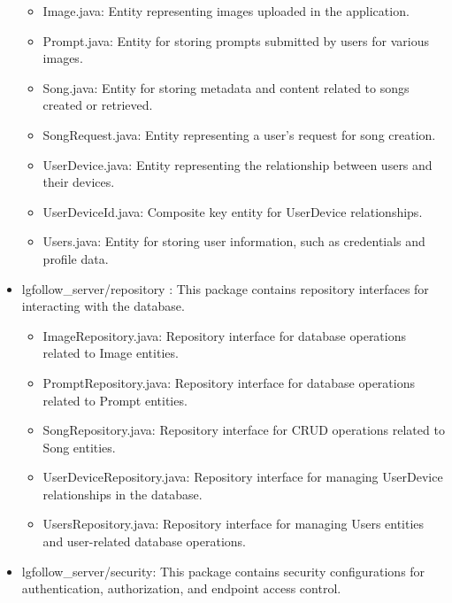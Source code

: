 \documentclass[conference]{IEEEtran}
\begin{document}
\begin{itemize}
\begin{itemize}
        \item Image.java: Entity representing images uploaded in the application. \\
        \item Prompt.java: Entity for storing prompts submitted by users for various images. \\
        \item Song.java: Entity for storing metadata and content related to songs created or retrieved. \\
        \item SongRequest.java: Entity representing a user's request for song creation. \\
        \item UserDevice.java: Entity representing the relationship between users and their devices. \\
        \item UserDeviceId.java: Composite key entity for UserDevice relationships. \\
        \item Users.java: Entity for storing user information, such as credentials and profile data. \\
    \end{itemize}
    \item lgfollow\_server/repository : This package contains repository interfaces for interacting with the database.
    \begin{itemize}
        \item ImageRepository.java: Repository interface for database operations related to Image entities. \\
        \item PromptRepository.java: Repository interface for database operations related to Prompt entities. \\
        \item SongRepository.java: Repository interface for CRUD operations related to Song entities. \\
        \item UserDeviceRepository.java: Repository interface for managing UserDevice relationships in the database. \\
        \item UsersRepository.java: Repository interface for managing Users entities and user-related database operations. \\
    \end{itemize}
    \item lgfollow\_server/security: This package contains security configurations for authentication, authorization, and endpoint access control.

\end{itemize}
\end{document}
